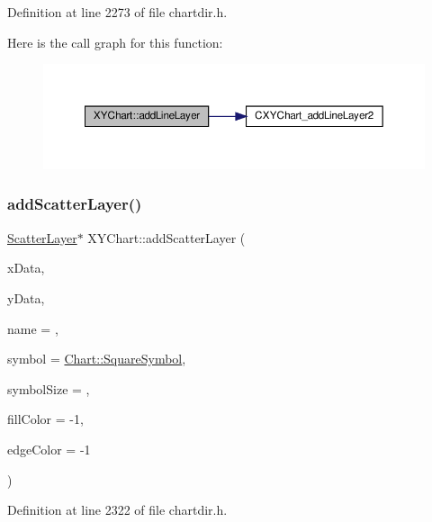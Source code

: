 Definition at line 2273 of file chartdir.\+h.

Here is the call graph for this function\+:
\nopagebreak
\begin{figure}[H]
\begin{center}
\leavevmode
\includegraphics[width=350pt]{class_x_y_chart_aba9690faaa6eed9b6bc44485dc0b955d_cgraph}
\end{center}
\end{figure}
\mbox{\label{class_x_y_chart_ad4f8da077a27f9331cd73009a269555b}} 
\subsubsection{\texorpdfstring{add\+Scatter\+Layer()}{addScatterLayer()}}
{\footnotesize\ttfamily \hyperlink{chartdir_8h_a012c369aef1d4ea8815a24da953964f2}{Scatter\+Layer}$\ast$ X\+Y\+Chart\+::add\+Scatter\+Layer (\begin{DoxyParamCaption}\item[{\hyperlink{class_double_array}{Double\+Array}}]{x\+Data,  }\item[{\hyperlink{class_double_array}{Double\+Array}}]{y\+Data,  }\item[{const char $\ast$}]{name = {},  }\item[{int}]{symbol = {\ttfamily \hyperlink{namespace_chart_a5392f7ff9dd37b8e092b2fe17dfb7d05acdc3a84456f3b4b382e714302650ecaa}{Chart\+::\+Square\+Symbol}},  }\item[{int}]{symbol\+Size = {},  }\item[{int}]{fill\+Color = {\ttfamily -\/1},  }\item[{int}]{edge\+Color = {\ttfamily -\/1} }\end{DoxyParamCaption})\hspace{0.3cm}{\ttfamily [inline]}}



Definition at line 2322 of file chartdir.\+h.

